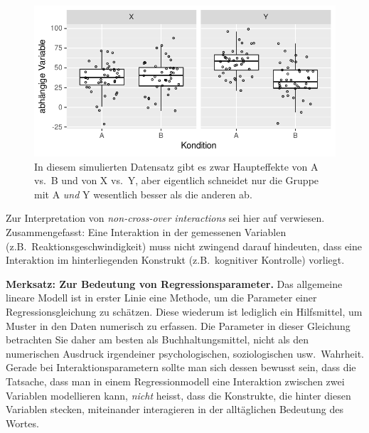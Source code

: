 \documentclass[oneside, 10pt]{book}\usepackage[]{graphicx}\usepackage[]{xcolor}
\newenvironment{knitrout}{}{} %
\begin{document}
\begin{knitrout}
\color{fgcolor}\begin{figure}[tp]

{\centering \includegraphics[width=.7\textwidth]{figs/unnamed-chunk-300-1} 

}

\caption{In diesem simulierten Datensatz gibt es zwar Haupteffekte von A vs.\ B und von X vs.\ Y, aber eigentlich schneidet nur die Gruppe mit A \emph{und} Y wesentlich besser als die anderen ab.\label{fig:maineffectinteraction}}\label{fig:unnamed-chunk-300}
\end{figure}

\end{knitrout}

Zur Interpretation von \textit{non-cross-over interactions} sei hier auf \citet{Wagenmakers2012}
verwiesen. Zusammengefasst:
Eine Interaktion in der gemessenen Variablen (z.B.\ Reaktionsgeschwindigkeit) muss nicht zwingend
darauf hindeuten, dass eine Interaktion im hinterliegenden Konstrukt (z.B.\ kognitiver
Kontrolle) vorliegt.

\medskip

\begin{framed}
\noindent \textbf{Merksatz: Zur Bedeutung von Regressionsparameter.}
Das allgemeine lineare Modell ist in erster Linie eine Methode,
um die Parameter einer Regressionsgleichung zu schätzen.
Diese wiederum ist lediglich ein Hilfsmittel, um Muster in den Daten
numerisch zu erfassen. Die Parameter in dieser Gleichung
betrachten Sie daher am besten als Buchhaltungsmittel, nicht als
den numerischen Ausdruck irgendeiner psychologischen, soziologischen usw.\ Wahrheit.
Gerade bei Interaktionsparametern sollte man sich dessen bewusst sein,
dass die Tatsache, dass man in einem Regressionmodell eine Interaktion
zwischen zwei Variablen modellieren kann, \emph{nicht} heisst,
dass die Konstrukte, die hinter diesen Variablen stecken, miteinander
interagieren in der alltäglichen Bedeutung des Wortes.
\end{framed}
\end{document}
